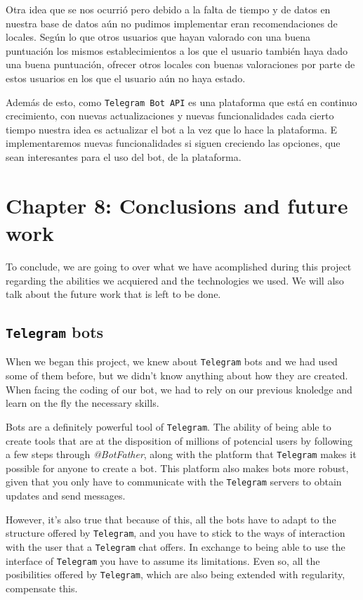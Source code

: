 \documentclass[oneside]{memoir}
\newcommand{\mychapter}[2]{
    \setcounter{chapter}{#1}
    \setcounter{section}{0}
    \chapter*{#2}
    \addcontentsline{toc}{chapter}{#2}
}
\begin{document}
Otra idea que se nos ocurrió pero debido a la falta de tiempo y de datos en nuestra base de datos aún no pudimos implementar eran recomendaciones de locales. Según lo que otros usuarios que hayan valorado con una buena puntuación los mismos establecimientos a los que el usuario también haya dado una buena puntuación, ofrecer otros locales con buenas valoraciones por parte de estos usuarios en los que el usuario aún no haya estado.

Además de esto, como \texttt{Telegram Bot API} es una plataforma que está en continuo crecimiento, con nuevas actualizaciones y nuevas funcionalidades cada cierto tiempo nuestra idea es actualizar el bot a la vez que lo hace la plataforma. E implementaremos nuevas funcionalidades si siguen creciendo las opciones, que sean interesantes para el uso del bot, de la plataforma.

\newpage
\mychapter{8}{Chapter 8: Conclusions and future work}
To conclude, we are going to over what we have acomplished during this project regarding the abilities we acquiered and the technologies we used. We will also talk about the future work that is left to be done.

\section{\texttt{Telegram} bots}
When we began this project, we knew about \texttt{Telegram} bots and we had used some of them before, but we didn't know anything about how they are created. When facing the coding of our bot, we had to rely on our previous knoledge and learn on the fly the necessary skills.

Bots are a definitely powerful tool of \texttt{Telegram}. The ability of being able to create tools that are at the disposition of millions of potencial users by following a few steps through \textit{@BotFather}, along with the platform that \texttt{Telegram} makes it possible for anyone to create a bot. This platform also makes bots more robust, given that you only have to communicate with the \texttt{Telegram} servers to obtain updates and send messages.

However, it's also true that because of this, all the bots have to adapt to the structure offered by \texttt{Telegram}, and you have to stick to the ways of interaction with the user that a \texttt{Telegram} chat offers. In exchange to being able to use the interface of \texttt{Telegram} you have to assume its limitations. Even so, all the posibilities offered by \texttt{Telegram}, which are also being extended with regularity, compensate this.
\end{document}
